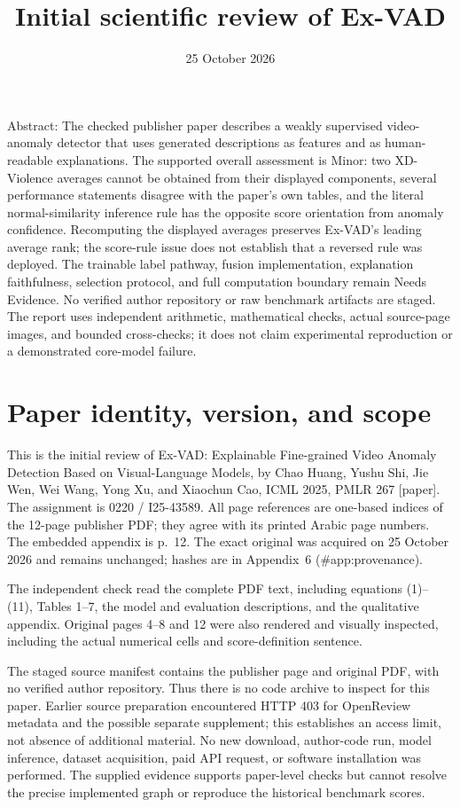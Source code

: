 \documentclass[10pt]{article}
\title{Initial scientific review of Ex-VAD}
\author{}
\date{25 October 2026}
\begin{document}
\maketitle
Abstract: The checked publisher paper describes a weakly supervised video-anomaly detector that uses generated descriptions as features and as human-readable explanations. The supported overall assessment is Minor: two XD-Violence averages cannot be obtained from their displayed components, several performance statements disagree with the paper’s own tables, and the literal normal-similarity inference rule has the opposite score orientation from anomaly confidence. Recomputing the displayed averages preserves Ex-VAD’s leading average rank; the score-rule issue does not establish that a reversed rule was deployed. The trainable label pathway, fusion implementation, explanation faithfulness, selection protocol, and full computation boundary remain Needs Evidence. No verified author repository or raw benchmark artifacts are staged. The report uses independent arithmetic, mathematical checks, actual source-page images, and bounded cross-checks; it does not claim experimental reproduction or a demonstrated core-model failure.\par
\section*{Paper identity, version, and scope}
This is the initial review of Ex-VAD: Explainable Fine-grained Video Anomaly Detection Based on Visual-Language Models, by Chao Huang, Yushu Shi, Jie Wen, Wei Wang, Yong Xu, and Xiaochun Cao, ICML 2025, PMLR 267 [paper]. The assignment is 0220 / I25-43589. All page references are one-based indices of the 12-page publisher PDF; they agree with its printed Arabic page numbers. The embedded appendix is p. 12. The exact original was acquired on 25 October 2026 and remains unchanged; hashes are in Appendix 6 (\#app:provenance).\par
The independent check read the complete PDF text, including equations (1)–(11), Tables 1–7, the model and evaluation descriptions, and the qualitative appendix. Original pages 4–8 and 12 were also rendered and visually inspected, including the actual numerical cells and score-definition sentence.\par
The staged source manifest contains the publisher page and original PDF, with no verified author repository. Thus there is no code archive to inspect for this paper. Earlier source preparation encountered HTTP 403 for OpenReview metadata and the possible separate supplement; this establishes an access limit, not absence of additional material. No new download, author-code run, model inference, dataset acquisition, paid API request, or software installation was performed. The supplied evidence supports paper-level checks but cannot resolve the precise implemented graph or reproduce the historical benchmark scores.\par
\end{document}

